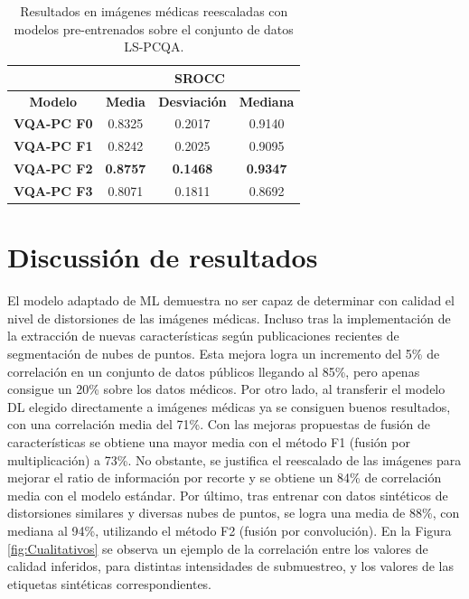 \begin{table}[H]
  \scriptsize 
  \centering
\begin{tabular}{|c|c|c|c|}
\hline
\rowcolor[HTML]{FFC702}
                       & \multicolumn{3}{c|}{\textbf{SROCC}}                                                                                                          \\ \hline
\rowcolor[HTML]{FFC702}
\textbf{Modelo}    & \textbf{Media} & \textbf{Desviación} & \textbf{Mediana} \\ \hline
\textbf{VQA-PC F0} & 0.8325           & 0.2017              & 0.9140           \\ \hline
\textbf{VQA-PC F1} & 0.8242           & 0.2025              & 0.9095           \\ \hline
\textbf{VQA-PC F2} & \textbf{0.8757}  & \textbf{0.1468}     & \textbf{0.9347}  \\ \hline
\textbf{VQA-PC F3} & 0.8071           & 0.1811              & 0.8692           \\ \hline
\end{tabular}
\caption[Resultados en imágenes médicas reescaladas entrenando en LS-PCQA.]{
  Resultados en imágenes médicas reescaladas con modelos pre-entrenados 
  sobre el conjunto de datos LS-PCQA. 
}\label{tab:LS-PCQA-FN}
\end{table}

\section{Discussión de resultados}
El modelo adaptado de ML demuestra no ser capaz de determinar con calidad 
el nivel de distorsiones de las imágenes médicas. Incluso tras la implementación 
de la extracción de nuevas características según publicaciones recientes 
de segmentación de nubes de puntos. Esta mejora logra un incremento del 5\% de correlación en un conjunto de datos públicos llegando al 85\%, pero apenas consigue un 20\% sobre los datos médicos. 
Por otro lado, al transferir el modelo DL elegido directamente a imágenes médicas ya se consiguen 
buenos resultados, con una correlación media del 71\%. Con las mejoras propuestas de 
fusión de características se obtiene una mayor media con el método F1 (fusión por multiplicación) a 73\%. 
No obstante, se justifica el reescalado de las imágenes para mejorar el 
ratio de información por recorte y se obtiene un 84\% de correlación media 
con el modelo estándar. Por último, tras entrenar con datos sintéticos de distorsiones similares y 
diversas nubes de puntos, se logra una media de 88\%, con mediana al 94\%, utilizando el método F2 (fusión por convolución).
En la Figura \ref{fig:Cualitativos} se observa un ejemplo de la correlación entre 
los valores de calidad inferidos, para distintas intensidades de submuestreo, 
y los valores de las etiquetas sintéticas correspondientes. 

